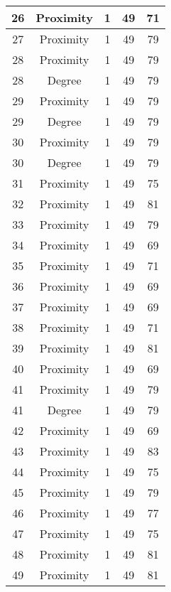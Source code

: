 \documentclass[results.tex]{subfiles}
\begin{document}
\begin{center}
\begin{tabular}{| c || c | c | c | c |}
    \hline
    26 & Proximity & 1 & 49 & 71 \\ 
    \hline
    27 & Proximity & 1 & 49 & 79 \\ 
    \hline
    28 & Proximity & 1 & 49 & 79 \\ 
    \hline
    28 & Degree & 1 & 49 & 79 \\ 
    \hline
    29 & Proximity & 1 & 49 & 79 \\ 
    \hline
    29 & Degree & 1 & 49 & 79 \\ 
    \hline
    30 & Proximity & 1 & 49 & 79 \\ 
    \hline
    30 & Degree & 1 & 49 & 79 \\ 
    \hline
    31 & Proximity & 1 & 49 & 75 \\ 
    \hline
    32 & Proximity & 1 & 49 & 81 \\ 
    \hline
    33 & Proximity & 1 & 49 & 79 \\ 
    \hline
    34 & Proximity & 1 & 49 & 69 \\ 
    \hline
    35 & Proximity & 1 & 49 & 71 \\ 
    \hline
    36 & Proximity & 1 & 49 & 69 \\ 
    \hline
    37 & Proximity & 1 & 49 & 69 \\ 
    \hline
    38 & Proximity & 1 & 49 & 71 \\ 
    \hline
    39 & Proximity & 1 & 49 & 81 \\ 
    \hline
    40 & Proximity & 1 & 49 & 69 \\ 
    \hline
    41 & Proximity & 1 & 49 & 79 \\ 
    \hline
    41 & Degree & 1 & 49 & 79 \\ 
    \hline
    42 & Proximity & 1 & 49 & 69 \\ 
    \hline
    43 & Proximity & 1 & 49 & 83 \\ 
    \hline
    44 & Proximity & 1 & 49 & 75 \\ 
    \hline
    45 & Proximity & 1 & 49 & 79 \\ 
    \hline
    46 & Proximity & 1 & 49 & 77 \\ 
    \hline
    47 & Proximity & 1 & 49 & 75 \\ 
    \hline
    48 & Proximity & 1 & 49 & 81 \\ 
    \hline
    49 & Proximity & 1 & 49 & 81 \\ 
    \hline   \end{tabular}
\end{center}
\end{document}
